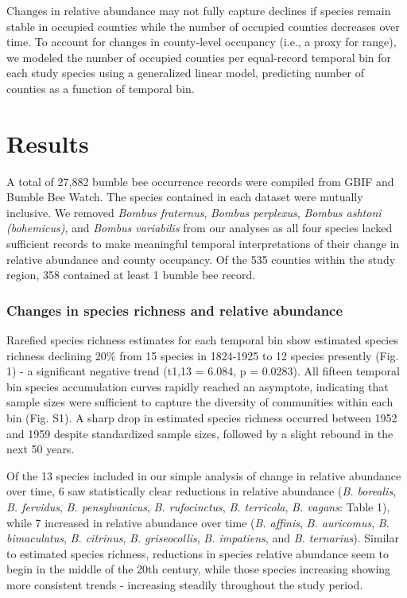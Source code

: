 \documentclass[11pt,]{article}
\begin{document}
Changes in relative abundance may not fully capture declines if species
remain stable in occupied counties while the number of occupied counties
decreases over time. To account for changes in county-level occupancy
(i.e., a proxy for range), we modeled the number of occupied counties
per equal-record temporal bin for each study species using a generalized
linear model, predicting number of counties as a function of temporal
bin.

\hypertarget{results}{%
\section{Results}\label{results}}

A total of 27,882 bumble bee occurrence records were compiled from GBIF
and Bumble Bee Watch. The species contained in each dataset were
mutually inclusive. We removed \emph{Bombus fraternus}, \emph{Bombus
perplexus}, \emph{Bombus ashtoni (bohemicus)}, and \emph{Bombus
variabilis} from our analyses as all four species lacked sufficient
records to make meaningful temporal interpretations of their change in
relative abundance and county occupancy. Of the 535 counties within the
study region, 358 contained at least 1 bumble bee record.

\hypertarget{changes-in-species-richness-and-relative-abundance}{%
\subsubsection{Changes in species richness and relative
abundance}\label{changes-in-species-richness-and-relative-abundance}}

Rarefied species richness estimates for each temporal bin show estimated
species richness declining 20\% from 15 species in 1824-1925 to 12
species presently (Fig. 1) - a significant negative trend (t1,13 =
6.084, p = 0.0283). All fifteen temporal bin species accumulation curves
rapidly reached an asymptote, indicating that sample sizes were
sufficient to capture the diversity of communities within each bin (Fig.
S1). A sharp drop in estimated species richness occurred between 1952
and 1959 despite standardized sample sizes, followed by a slight rebound
in the next 50 years.

Of the 13 species included in our simple analysis of change in relative
abundance over time, 6 saw statistically clear reductions in relative
abundance (\emph{B. borealis}, \emph{B. fervidus}, \emph{B.
pensylvanicus}, \emph{B. rufocinctus}, \emph{B. terricola}, \emph{B.
vagans}: Table 1), while 7 increased in relative abundance over time
(\emph{B. affinis}, \emph{B. auricomus}, \emph{B. bimaculatus}, \emph{B.
citrinus}, \emph{B. griseocollis}, \emph{B. impatiens}, and \emph{B.
ternarius}). Similar to estimated species richness, reductions in
species relative abundance seem to begin in the middle of the 20th
century, while those species increasing showing more consistent trends -
increasing steadily throughout the study period.
\end{document}

